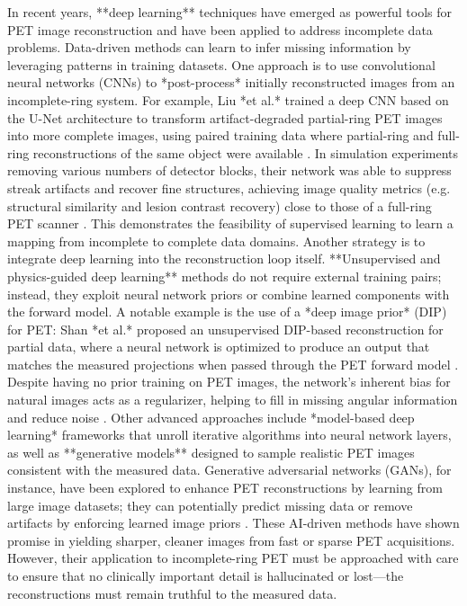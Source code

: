 \documentclass[
reprint,
superscriptaddress,
nofootinbib,
amsmath,amssymb,
aps,
prd,
]{revtex4-2}
\begin{document}
In recent years, **deep learning** techniques have emerged as powerful tools for PET image reconstruction and have been applied to address incomplete data problems. Data-driven methods can learn to infer missing information by leveraging patterns in training datasets. One approach is to use convolutional neural networks (CNNs) to *post-process* initially reconstructed images from an incomplete-ring system. For example, Liu *et al.* trained a deep CNN based on the U-Net architecture to transform artifact-degraded partial-ring PET images into more complete images, using paired training data where partial-ring and full-ring reconstructions of the same object were available \cite{liu2019}. In simulation experiments removing various numbers of detector blocks, their network was able to suppress streak artifacts and recover fine structures, achieving image quality metrics (e.g. structural similarity and lesion contrast recovery) close to those of a full-ring PET scanner \cite{liu2019}. This demonstrates the feasibility of supervised learning to learn a mapping from incomplete to complete data domains. Another strategy is to integrate deep learning into the reconstruction loop itself. **Unsupervised and physics-guided deep learning** methods do not require external training pairs; instead, they exploit neural network priors or combine learned components with the forward model. A notable example is the use of a *deep image prior* (DIP) for PET: Shan *et al.* proposed an unsupervised DIP-based reconstruction for partial data, where a neural network is optimized to produce an output that matches the measured projections when passed through the PET forward model \cite{shan2024}. Despite having no prior training on PET images, the network’s inherent bias for natural images acts as a regularizer, helping to fill in missing angular information and reduce noise \cite{shan2024}. Other advanced approaches include *model-based deep learning* frameworks that unroll iterative algorithms into neural network layers, as well as **generative models** designed to sample realistic PET images consistent with the measured data. Generative adversarial networks (GANs), for instance, have been explored to enhance PET reconstructions by learning from large image datasets; they can potentially predict missing data or remove artifacts by enforcing learned image priors \cite{reader2023, vashistha2024}. These AI-driven methods have shown promise in yielding sharper, cleaner images from fast or sparse PET acquisitions. However, their application to incomplete-ring PET must be approached with care to ensure that no clinically important detail is hallucinated or lost—the reconstructions must remain truthful to the measured data.
\end{document}
